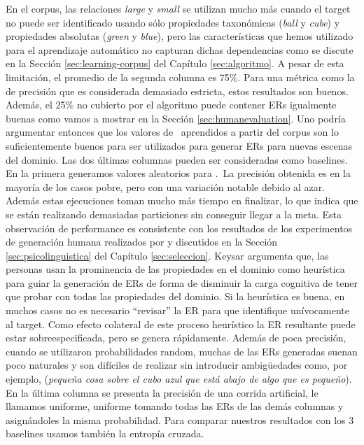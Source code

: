 En el corpus, las relaciones \emph{large} y \emph{small} se utilizan mucho m\'as cuando el target no puede ser identificado usando s\'olo propiedades taxon\'omicas (\emph{ball} y \emph{cube}) y propiedades absolutas (\emph{green} y \emph{blue}), pero las caracter\'{i}sticas que hemos utilizado para el aprendizaje autom\'atico no capturan dichas dependencias como se discute en la Secci\'on \ref{sec:learning-corpus} del Cap\'itulo \ref{sec:algoritmo}.
A pesar de esta limitaci\'on, el promedio de la segunda columna es 75\%. Para una m\'etrica como la de precisi\'on que es considerada demasiado estricta, estos resultados son buenos. Adem\'as, el 25\% no cubierto por el algoritmo puede contener ERs igualmente buenas como vamos a mostrar en la Secci\'on \ref{sec:humanevaluation}. Uno podr\'ia argumentar entonces que los valores de \puse\ aprendidos a partir del corpus son lo suficientemente buenos para ser utilizados para generar ERs para nuevas escenas del dominio.
Las dos \'ultimas columnas pueden ser consideradas como baselines. En la primera generamos
valores aleatorios para \puse.~La precisi\'on obtenida es en la mayor\'{i}a de los casos pobre, pero con
una variaci\'on notable debido al azar. Adem\'as estas ejecuciones toman mucho m\'as tiempo en finalizar, lo que indica que se est\'an realizando demasiadas particiones sin conseguir llegar a la meta. Esta observaci\'on de performance es consistente con los resultados de los experimentos de generaci\'on humana realizados por \cite{keysar:Curr98} y discutidos en la Secci\'on \ref{sec:psicolinguistica} del Cap\'itulo \ref{sec:seleccion}. Keysar argumenta que, las personas usan la prominencia de las propiedades en el dominio como heur\'istica para guiar la generaci\'on de ERs de forma de disminuir la carga cognitiva de tener que probar con todas las propiedades del dominio. Si la heur\'istica es buena, en muchos casos no es necesario ``revisar'' la ER para que identifique un\'ivocamente al target. Como efecto colateral de este proceso heur\'istico la ER resultante puede estar sobreespecificada, pero se genera r\'apidamente.  
Adem\'as de poca precisi\'on, cuando se utilizaron probabilidades random,  muchas de las ERs generadas suenan poco naturales y son dif\'iciles de realizar sin introducir ambig\"uedades como, por ejemplo, (\textit{peque\~na cosa sobre
el cubo azul que est\'a abajo de algo que es peque\~no}). En la \'ultima columna se presenta la precisi\'on de una corrida artificial, le llamamos uniforme, uniforme tomando todas las ERs de las dem\'as columnas y asign\'andoles la misma probabilidad.
Para comparar nuestros resultados con los 3 baselines usamos tambi\'en la entrop\'ia cruzada.

